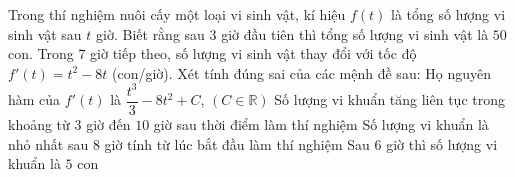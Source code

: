 \begin{ex}%
	Trong thí nghiệm nuôi cấy một loại vi sinh vật, kí hiệu $f(t)$ là tổng số lượng vi sinh vật sau $t$ giờ. Biết rằng sau $3$ giờ đầu tiên thì tổng số lượng vi sinh vật là $50$ con. Trong $7$ giờ tiếp theo, số lượng vi sinh vật thay đổi với tốc độ $f'(t) = t^2 - 8t$ (con/giờ). Xét tính đúng sai của các mệnh đề  sau:
	 \choiceTF
		 {Họ nguyên hàm của $f'(t)$ là $\dfrac{t^3}{3} - 8t^2 + C$, $(C \in \mathbb{R})$}
		{Số lượng vi khuẩn tăng liên tục trong khoảng từ $3$ giờ đến $10$ giờ sau thời điểm làm thí nghiệm} 
		{\True Số lượng vi khuẩn là nhỏ nhất  sau $8$ giờ tính từ lúc bắt đầu làm thí nghiệm}
		{\True Sau $6$ giờ  thì số lượng vi khuẩn là $5$ con}
\end{ex}

